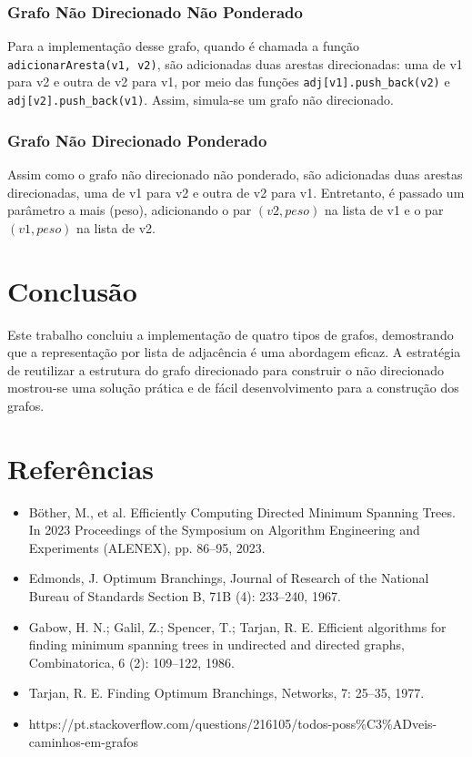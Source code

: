\documentclass[12pt]{article}
\begin{document}
\subsubsection{Grafo Não Direcionado Não Ponderado}
Para a implementação desse grafo, quando é chamada a função 
\texttt{adicionarAresta(v1, v2)}, são adicionadas duas arestas direcionadas: uma de v1 para 
v2 e outra de v2 para v1, por meio das funções \texttt{adj[v1].push\_back(v2)} e 
\texttt{adj[v2].push\_back(v1)}. Assim, simula-se um grafo não direcionado.

\subsubsection{Grafo Não Direcionado Ponderado}
Assim como o grafo não direcionado não ponderado, são adicionadas duas arestas 
direcionadas, uma de v1 para v2 e outra de v2 para v1. Entretanto, é passado 
um parâmetro a mais (peso), adicionando o par $(v2, peso)$ na lista de v1 e o par $(v1, peso)$ 
na lista de v2.  

\section{Conclusão}
Este trabalho concluiu a implementação de quatro tipos de grafos, demostrando que a 
representação por lista de adjacência é uma abordagem eficaz. A estratégia de reutilizar a estrutura 
do grafo direcionado para construir o não direcionado mostrou-se uma solução prática e de fácil 
desenvolvimento para a construção dos grafos.

\section*{Referências}

\begin{itemize}
    \item Böther, M., et al. Efficiently Computing Directed Minimum Spanning Trees. In 2023 Proceedings of the Symposium on Algorithm Engineering and Experiments (ALENEX), pp. 86--95, 2023.
    \item Edmonds, J. Optimum Branchings, Journal of Research of the National Bureau of Standards Section B, 71B (4): 233--240, 1967.
    \item Gabow, H. N.; Galil, Z.; Spencer, T.; Tarjan, R. E. Efficient algorithms for finding minimum spanning trees in undirected and directed graphs, Combinatorica, 6 (2): 109--122, 1986.
    \item Tarjan, R. E. Finding Optimum Branchings, Networks, 7: 25--35, 1977.
    \item https://pt.stackoverflow.com/questions/216105/todos-poss\%C3\%ADveis-caminhos-em-grafos
\end{itemize}
\end{document}
